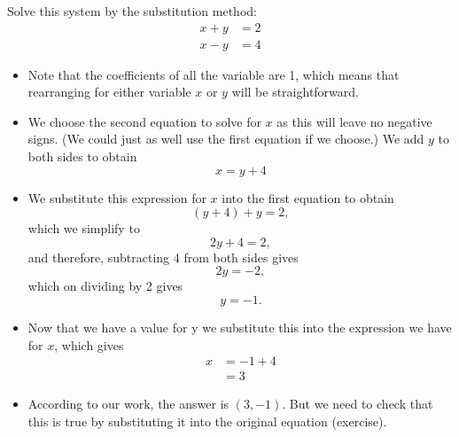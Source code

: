 \begin{myexample}
Solve this system by the substitution method:
\begin{align*}
	x+y & =	2 \\
	x-y & =4  
\end{align*}
\end{myexample}
\begin{myProof}
	\begin{itemize}
		\item Note that the coefficients of all the variable are 1, which means that rearranging for
		either variable $x$ or $y$ will be straightforward.
		\item   We choose the second equation to solve for $x$ as this will leave no negative signs. (We
		could just as well use the first equation if we choose.) We add $y$ to both sides to obtain
		\begin{equation*}
			x= y +4
		\end{equation*}
		\item   We substitute this expression for $x$ into the first equation to obtain
		\begin{equation*}
			(y+4 )+ y=2 ,
		\end{equation*}
		which we \gls{simplify} to
		\begin{equation*}
			2 y+4=2 ,
		\end{equation*}
		and therefore, subtracting 4 from both sides gives
		\begin{equation*}
			2 y=- 2 ,
		\end{equation*}
		which on dividing by 2 gives
		\begin{equation*}
			y =- 1 .
		\end{equation*}
		\item   Now that we have a value for y we substitute this into the expression we have for $x$,
		which gives
		\begin{align*}
			x & = -1 +4 \\
			  & = 3     
		\end{align*}
		\item According to our work, the answer is $(3, -1)$. But we need to check that this is true by
		substituting it into the original equation (exercise).
	\end{itemize}
\end{myProof}
																											
